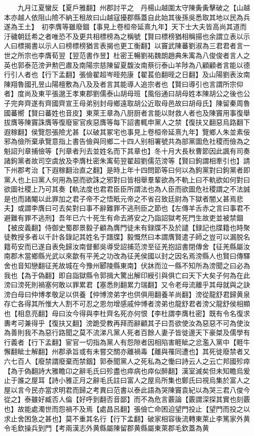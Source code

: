 　　九月江夏蠻反【夏戶雅翻】州郡討平之　丹楊山越圍太守陳夤夤擊破之【山越本亦越人依阻山險不納王租故曰山越寇擾郡縣蓋自此始其後孫吳悉取其地以民為兵遂為王土】　初李膺等雖廢錮【事見上卷桓帝延熹九年】天下士大夫皆高尚其道而汙穢朝廷希之者唯恐不及更共相標榜為之稱號【賢曰標榜猶相稱揚也余謂立表以示人曰標揭書以示人曰榜標榜猶言表揭也更工衡翻】以竇武陳蕃劉淑為三君君者言一世之所宗也李膺荀翌【翌范書作昱】杜密王暢劉祐魏朗趙典朱㝢為八俊俊者言人之英也郭泰范滂尹勲巴肅及南陽宗慈陳留夏馥汝南蔡衍泰山羊陟為八顧顧者言能以德行引人者也【行下孟翻】張儉翟超岑晊苑康【翟萇伯翻晊之日翻】及山陽劉表汝南陳翔魯國孔昱山陽檀敷為八及及者言其能導人追宗者也【賢曰導引也言謂所宗仰者】度尚及東平張邈王孝東郡劉儒泰山胡母班【風俗通曰胡母姓本陳胡公之後也公子完奔齊遂有齊國齊宣王母弟别封母鄉遠取胡公近取母邑故曰胡母氏】陳留秦周魯國蕃嚮【賢曰蕃姓也音皮】東萊王章為八厨厨者言能以財救人者也及陳竇用事復舉拔膺等陳竇誅膺等復廢宦官疾惡膺等每下詔書輒申黨人之禁【復扶又翻惡烏路翻下遐稼翻】侯覽怨張險尤甚【以破其冢宅也事見上卷桓帝延熹九年】覽鄉人朱並素佞邪為儉所棄承覽意指上書告儉與同鄉二十四人别相署號共為部黨圖危社稷而儉為之魁詔刋章捕儉等【刋章者刋去並姓名而下其章也】冬十月大長秋曹節因此諷有司奏諸鉤黨者故司空虞放及李膺杜密朱㝢荀翌翟超劉儒范滂等【賢曰鉤謂相牽引也】請下州郡考治【下遐稼翻治直之翻】是時上年十四問節等曰何以為鉤黨對曰鉤黨者即黨人也上曰黨人何用為惡而欲誅之邪對曰皆相舉羣輩欲為不軌上曰不軌欲如何對曰欲圖社稷上乃可其奏【軌法度也君君臣臣所謂法也為人臣而欲圖危社稷謂之不法誠是也而諸閹以此罪加之君子帝不之悟眂元帝之不省召致廷尉為下獄者闇乂甚焉悲夫】或謂李膺曰可去矣對曰事不辭難罪不逃刑臣之節也【左傳羊舌赤之言曰事君不避難有罪不逃刑】吾年已六十死生有命去將安之乃詣詔獄考死門生故吏並被禁錮【被皮義翻】侍御史蜀郡景毅子顧為膺門徒未有録牒不及於譴【録記也牒籍也時聚徒教授多者以千計各錄記其姓名于譜牒】毅慨然曰本謂膺賢遣子師之豈可以漏脱名籍苟安而已遂自表免歸汝南督郵吳導受詔捕范滂至征羌抱詔書閉傳舍【征羌縣屬汝南郡木當鄉縣光武以來歙有平羌之功改為征羌侯國以封之因名焉滂縣人也賢曰傳驛舍也音知戀翻征羌故城在今豫州郾陵縣東南】伏牀而泣一縣不知所為滂聞之曰必為我也【為于偽翻】即自詣獄縣令郭揖大驚出解印綬引與俱亡曰天下大矣子何為在此滂曰滂死則禍塞何敢以罪累君【塞悉則翻累力瑞翻】又令老母流離乎其母就與之訣滂白母曰仲博孝敬足以供養【仲博滂弟字也供俱用翻養羊尚翻】滂從龍舒君歸黄泉存亡各得其所惟大人割不可忍之恩勿增感戚仲博者滂弟也龍舒君者滂父龍舒侯相顯也【相息亮翻】母曰汝今得與李杜齊名死亦何恨【李杜謂李膺杜密】既有令名復求夀考可兼得乎【復扶又翻】滂跪受教再拜而辭顧其子曰吾欲使汝為惡惡不可為使汝為善則我不為惡行路聞之莫不流涕凡黨人死者百餘人妻子皆徙邊天下豪桀及儒學有行義者【行下孟翻】宦官一切指為黨人有怨隙者因相陷害睚眦之忿濫入黨中【睚牛懈翻眦士解翻】州郡承旨或有未嘗交關亦離禍毒【離與罹同遭也】其死徙廢禁者又六七百人【廢禁謂廢棄而禁錮】郭泰聞黨人之死私為之慟曰詩云人之云亡邦國殄瘁【為于偽翻詩大雅瞻卬之辭毛氏曰殄盡也瘁病也瘁似醉翻】漢室滅矣但未知瞻烏爰止于誰之屋耳【詩小雅正月之辭毛氏註曰富人之屋烏所集也鄭氏曰視烏集於富人之屋以言今民亦當求明君而歸之考異曰范書以泰此語為哭陳竇袁紀以為哭三君八俊今從之】泰雖好臧否人倫【好呼到翻否音鄙】而不為危言覈論【覈謂深探其實也刻覈也】故能處濁世而怨禍不及焉【處昌呂翻】張儉亡命困迫望門投止【望門而投之以求止舍困急之甚也】莫不重其名行【行下孟翻】破家相容後流轉東萊止李篤家外黄令毛欽操兵到門【考兩漢志外黄縣屬陳留郡黄縣屬東萊郡毛欽蓋為黄
